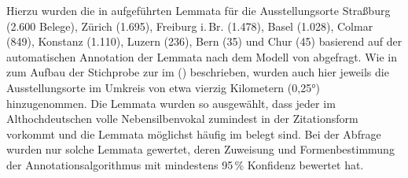 Hierzu wurden die in  aufgeführten Lemmata für die
Ausstellungsorte
Straßburg (2.600 Belege),
% 
Zürich (1.695),
% 
Freiburg i.\,Br. (1.478),
% 
Basel (1.028),
% 
Colmar (849),
% 
Konstanz (1.110),
% 
Luzern (236),
% 
Bern (35)
% 
und Chur (45)
% 
basierend auf der automatischen Annotation der Lemmata nach dem
Modell von \citet{schmid2019} abgefragt. Wie in  zum
Aufbau der Stichprobe zur  im  (\CAO) beschrieben, wurden auch hier jeweils die
Ausstellungsorte im Umkreis von etwa vierzig Kilometern (0,25°) hinzugenommen.
Die Lemmata wurden so ausgewählt, dass jeder im
Althochdeutschen volle Nebensilbenvokal zumindest in der
Zitationsform vorkommt und die Lemmata möglichst häufig im \CAO{} belegt sind.
Bei der Abfrage wurden nur solche Lemmata gewertet, deren Zuweisung und
Formenbestimmung der Annotations\-algorithmus mit mindestens
95\,\% Konfidenz bewertet hat.

